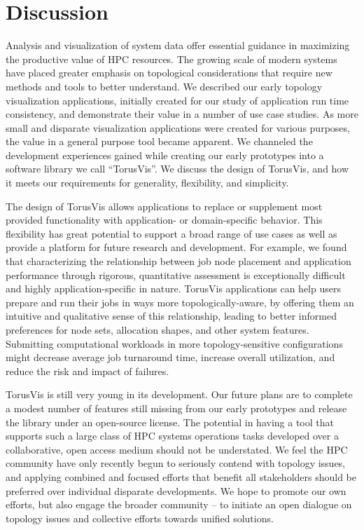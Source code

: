 \documentclass[
    10pt,
    conference,
    compsocconf
]{IEEEtran}
\begin{document}

\section{Discussion}

    Analysis and visualization of system data offer essential guidance in
    maximizing the productive value of HPC resources.  The growing scale of
    modern systems have placed greater emphasis on topological considerations
    that require new methods and tools to better understand.  We described our
    early topology visualization applications, initially created for our study
    of application run time consistency, and demonstrate their value in a number
    of use case studies.  As more small and disparate visualization applications
    were created for various purposes, the value in a general purpose tool
    became apparent. We channeled the development experiences gained while
    creating our early prototypes into a software library we call ``TorusVis''.
    We discuss the design of TorusVis, and how it meets our requirements for
    generality, flexibility, and simplicity.

    The design of TorusVis allows applications to replace or supplement most
    provided functionality with application- or domain-specific behavior.  This
    flexibility has great potential to support a broad range of use cases as
    well as provide a platform for future research and development.  For
    example, we found that characterizing the relationship between job node
    placement and application performance through rigorous, quantitative
    assessment is exceptionally difficult and highly application-specific in
    nature.  TorusVis applications can help users prepare and run their jobs in
    ways more topologically-aware, by offering them an intuitive and qualitative
    sense of this relationship, leading to better informed preferences for node
    sets, allocation shapes, and other system features.  Submitting
    computational workloads in more topology-sensitive configurations might
    decrease average job turnaround time, increase overall utilization, and
    reduce the risk and impact of failures.

    TorusVis is still very young in its development.  Our future plans are to
    complete a modest number of features still missing from our early prototypes
    and release the library under an open-source license.  The potential in
    having a tool that supports such a large class of HPC systems operations
    tasks developed over a collaborative, open access medium should not be
    understated.  We feel the HPC community have only recently begun to
    seriously contend with topology issues, and applying combined and focused
    efforts that benefit all stakeholders should be preferred over individual
    disparate developments.  We hope to promote our own efforts, but also engage
    the broader community -- to initiate an open dialogue on topology issues
    and collective efforts towards unified solutions.
\end{document}
